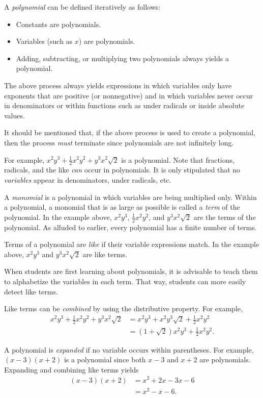 \documentclass[12pt]{article}
\begin{document}

A \emph{polynomial} can be defined iteratively as follows:
\begin{itemize}
\item Constants are polynomials.
\item Variables (such as $x$) are polynomials.
\item Adding, subtracting, or multiplying two polynomials always yields a polynomial.
\end{itemize}

The above process always yields expressions in which variables only have exponents that are positive (or nonnegative) and in which variables never occur in denominators or within functions such as under radicals or inside absolute values.

It should be mentioned that, if the above process is used to create a polynomial, then the process \emph{must} terminate since polynomials are not infinitely long.

For example, $x^2y^3+\frac{1}{2}x^2y^2+y^3x^2\sqrt{2}$ is a polynomial.  Note that fractions, radicals, and the like \emph{can} occur in polynomials.  It is only stipulated that no \emph{variables} appear in denominators, under radicals, etc.

A \emph{monomial} is a polynomial in which variables are being multiplied only.  Within a polynomial, a monomial that is as large as possible is called a \emph{term} of the polynomial.  In the example above, $x^2y^3$, $\frac{1}{2}x^2y^2$, and $y^3x^2\sqrt{2}$ are the terms of the polynomial.  As alluded to earlier, every polynomial has a finite number of terms.

Terms of a polynomial are \emph{like} if their variable expressions match.  In the example above, $x^2y^3$ and $y^3x^2\sqrt{2}$ are like terms.

When students are first learning about polynomials, it is advisable to teach them to alphabetize the variables in each term.  That way, students can more easily detect like terms.

Like terms can be \emph{combined} by using the distributive property.  For example,
\begin{align*}
x^2y^3+\frac{1}{2}x^2y^2+y^3x^2\sqrt{2} & =x^2y^3+x^2y^3\sqrt{2}+\frac{1}{2}x^2y^2 \\
& =(1+\sqrt{2})x^2y^3+\frac{1}{2}x^2y^2.
\end{align*}

A polynomial is \emph{expanded} if no variable occurs within parentheses.  For example, $(x-3)(x+2)$ is a polynomial since both $x-3$ and $x+2$ are polynomials.  Expanding and combining like terms yields
\begin{align*}
(x-3)(x+2) & =x^2+2x-3x-6 \\
& =x^2-x-6.
\end{align*}
\end{document}
